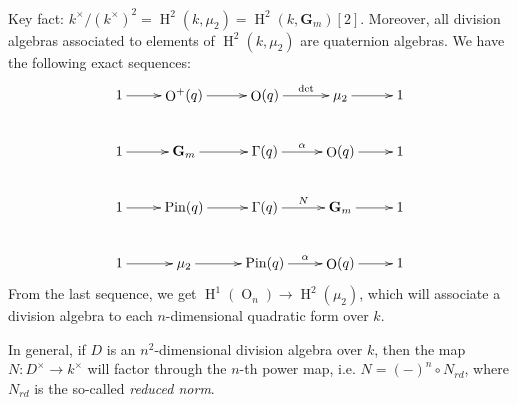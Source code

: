 \documentclass{article}
\DeclareMathOperator{\h}{H}
\DeclareMathOperator{\ortho}{O}
\DeclareMathOperator{\pin}{Pin}
\newcommand{\dG}{\mathbf{G}}
\begin{document}
Key fact: $k^\times / (k^\times)^2 = \h^2(k, \mu_2) = \h^2(k, \dG_m)[2]$. 
Moreover, all division algebras associated to elements of 
$\h^2(k, \mu_2)$ are quaternion algebras. We have the following exact sequences: 
\[\xymatrix{
  1 \ar[r] 
    & \ortho^+(q) \ar[r] 
    & \ortho(q) \ar[r]^-{\det} 
    & \mu_2 \ar[r] 
    & 1 \\
  1 \ar[r] 
    & \dG_m \ar[r] 
    & \Gamma(q) \ar[r]^-\alpha 
    & \ortho(q) \ar[r] 
    & 1 \\
  1 \ar[r] 
    & \pin(q) \ar[r] 
    & \Gamma(q) \ar[r]^-N 
    & \dG_m \ar[r] 
    & 1 \\
  1 \ar[r] 
    & \mu_2 \ar[r] 
    & \pin(q) \ar[r]^-\alpha 
    & \ortho(q) \ar[r] 
    & 1
}\]
From the last sequence, we get $\h^1(\ortho_n) \to \h^2(\mu_2)$, which will 
associate a division algebra to each $n$-dimensional quadratic form over $k$. 

In general, if $D$ is an $n^2$-dimensional division algebra over $k$, then 
the map $N:D^\times \to k^\times$ will factor through the $n$-th power map, 
i.e. $N=(-)^n\circ N_{rd}$, where $N_{rd}$ is the so-called \emph{reduced norm}. 
\end{document}

